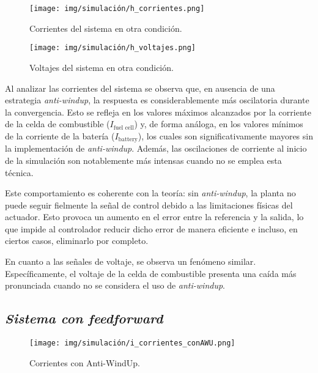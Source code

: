 \begin{figure}[H]
    \centering
    \texttt{[image: img/simulación/h\_corrientes.png]}
    \caption{Corrientes del sistema en otra condición.}
    \label{fig:h_corrientes}
\end{figure}

\begin{figure}[H]
    \centering
    \texttt{[image: img/simulación/h\_voltajes.png]}
    \caption{Voltajes del sistema en otra condición.}
    \label{fig:h_voltajes}
\end{figure}
Al analizar las corrientes del sistema se observa que, en ausencia de una estrategia \textit{anti-windup}, la respuesta es considerablemente más oscilatoria 
durante la convergencia. Esto se refleja en los valores máximos alcanzados por la corriente de la celda de 
combustible ($I_{\text{fuel cell}}$) y, de forma análoga, en los valores 
mínimos de la corriente de la batería ($I_{\text{battery}}$), los cuales son significativamente 
mayores sin la implementación de \textit{anti-windup}. Además, las oscilaciones de corriente 
al inicio de la simulación son notablemente más intensas cuando no se emplea esta técnica.

Este comportamiento es coherente con la teoría: sin 
\textit{anti-windup}, la planta no puede seguir fielmente la señal de control debido a las limitaciones
 físicas del actuador. Esto provoca un aumento en el error entre la referencia y la salida, 
 lo que impide al controlador reducir dicho error de manera eficiente e incluso, en ciertos casos, eliminarlo por completo.

En cuanto a las señales de voltaje, se observa un fenómeno similar. 
Específicamente, el voltaje de la celda de combustible presenta una 
caída más pronunciada cuando no se considera el uso de \textit{anti-windup}.
\subsection{\textit{Sistema con feedforward}}

\begin{figure}[H]
    \centering
    \texttt{[image: img/simulación/i\_corrientes\_conAWU.png]}
    \caption{Corrientes con Anti-WindUp.}
    \label{fig:i_corrientes_conAWU}
\end{figure}

